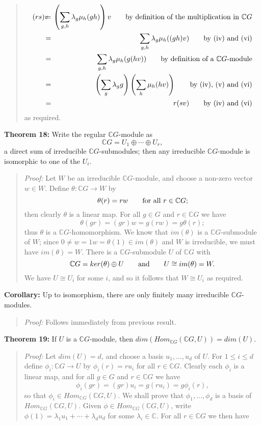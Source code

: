 {\begin{quote}
\begin{eqnarray*}
(rs)v
\!\!\!\!&=&\!\!\!\!\left(\sum_{g,h}\lambda_g\mu_h(gh)\right)v
\qquad\hbox{by definition of the multiplication in }{\mathbb C}G\\
\!\!\!\!&=&\!\!\!\!\sum_{g,h}\lambda_g\mu_h((gh)v)
\qquad\hbox{by (iv) and (vi)}\\
\!\!\!\!&=&\!\!\!\!\sum_{g,h}\lambda_g\mu_h(g(hv))
\qquad\hbox{by definition of a ${\mathbb C}G$-module}\\
\!\!\!\!&=&\!\!\!\!\left(\sum_g\lambda_gg\right)\left(\sum_h\mu_h(hv)\right)
\qquad\hbox{by (iv), (v) and (vi)}\\
\!\!\!\!&=&\!\!\!\!r(sv)\qquad\hbox{by (iv) and (vi)}
\end{eqnarray*}
as required.
\end{quote}
{\bf Theorem 18:} Write the regular ${\mathbb C}G$-module as
$${\mathbb C}G=U_1 \oplus \cdots \oplus U_r,$$
a direct sum of irreducible ${\mathbb C}G$-submodules; then any irreducible
${\mathbb C}G$-module is isomorphic to one of the $U_i$.
\begin{quote}
\emph{Proof:}
Let $W$ be an irreducible ${\mathbb C}G$-module, and choose a non-zero vector
$w\in W$. Define $\theta:{\mathbb C}G\rightarrow W$ by
$$\theta(r)=rw\qquad\hbox{for all }r\in{\mathbb C}G;$$
then clearly $\theta$ is a linear map. For all $g\in G$ and $r\in{\mathbb C}G$ we have
$$\theta(gr)=(gr)w=g(rw)=g\theta(r);$$
thus $\theta$ is a ${\mathbb C}G$-homomorphism. We know that
$im(\theta)$ is a ${\mathbb C}G$-submodule of $W$; since
$0\neq w=1w=\theta(1)\in im(\theta)$ and $W$ is irreducible, we must have
$im(\theta)=W$. There is a ${\mathbb C}G$-submodule $U$ of
${\mathbb C}G$ with
$${\mathbb C}G=ker(\theta) \oplus U\qquad\hbox{and}\qquad U \cong im(\theta)=W.$$
We have $U\cong U_i$ for some $i$, and so it follows that
$W\cong U_i$ as required.\
\end{quote}
{\bf Corollary:} Up to isomorphism, there are only finitely many
irreducible ${\mathbb C}G$-modules.
\begin{quote}
\emph{Proof:}
Follows immediately from previous result. 
\end{quote}
{\bf Theorem 19:} If $U$ is a ${\mathbb C}G$-module, then
$ dim(Hom_{{\mathbb C}G}({\mathbb C}G,U))= dim(U)$.
\begin{quote}
\emph{Proof:}
Let $dim(U)=d$, and choose a basis $u_1,\dots,u_d$ of $U$. For
$1\leq i\leq d$ define $\phi_i:{\mathbb C}G\rightarrow U$ by $\phi_i(r)=ru_i$ for all
$r\in{\mathbb C}G$. Clearly each $\phi_i$ is a linear map, and for all $g\in G$ and
$r\in{\mathbb C}G$ we have
$$\phi_i(gr)=(gr)u_i=g(ru_i)=g\phi_i(r),$$
so that $\phi_i\in Hom_{{\mathbb C}G}({\mathbb C}G,U)$. We shall prove that $\phi_1,\dots,\phi_d$ is
a basis of $Hom_{{\mathbb C}G}({\mathbb C}G,U)$. Given $\phi\in Hom_{{\mathbb C}G}({\mathbb C}G,U)$, write
$\phi(1)=\lambda_1u_1+\cdots+\lambda_du_d$ for some $\lambda_i\in{\mathbb C}$. For all
$r\in{\mathbb C}G$ we then have


\end{quote}}
